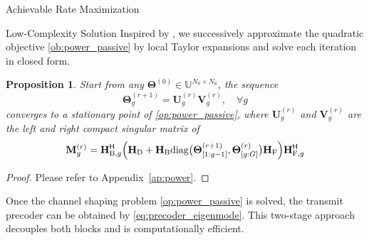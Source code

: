 \documentclass[journal]{IEEEtran}
\newtheorem{proposition}{Proposition}
\begin{document}
\begin{section}{Achievable Rate Maximization}
\begin{subsection}{Low-Complexity Solution}
		Inspired by \cite{Nie2017}, we successively approximate the quadratic objective \eqref{ob:power_passive} by local Taylor expansions and solve each iteration in closed form.

		\begin{proposition}\label{pp:power}
			Start from any $\mathbf{\Theta}^{(0)} \in \mathbb{U}^{N_\mathrm{S} \times N_\mathrm{S}}$, the sequence
			\begin{equation}
				\mathbf{\Theta}_g^{(r+1)} = \mathbf{U}_g^{(r)} \mathbf{V}_g^{(r)}, \quad \forall g
			\end{equation}
			converges to a stationary point of \eqref{op:power_passive}, where $\mathbf{U}_g^{(r)}$ and $\mathbf{V}_g^{(r)}$ are the left and right compact singular matrix of
			\begin{equation}
				\mathbf{M}_g^{(r)} = \mathbf{H}_{\mathrm{B},g}^\mathsf{H} \Bigl(\mathbf{H}_\mathrm{D} + \mathbf{H}_\mathrm{B} \mathrm{diag}\bigl(\mathbf{\Theta}_{[1:g-1]}^{(r+1)},\mathbf{\Theta}_{[g:G]}^{(r)}\bigr) \mathbf{H}_\mathrm{F}\Bigr) \mathbf{H}_{\mathrm{F},g}^\mathsf{H}
			\end{equation}
		\end{proposition}

		\begin{proof}
			Please refer to Appendix~\ref{ap:power}.
		\end{proof}
		Once the channel shaping problem \eqref{op:power_passive} is solved, the transmit precoder can be obtained by \eqref{eq:precoder_eigenmode}.
		This two-stage approach decouples both blocks and is computationally efficient.
	\end{subsection}






\end{section}
\end{document}
